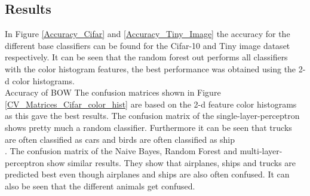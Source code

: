\documentclass[11pt]{article}
\begin{document}
\subsection{Results}
In Figure \ref{Accuracy_Cifar} and \ref{Accuracy_Tiny_Image} the accuracy for the different base classifiers can be found for the Cifar-10 and Tiny image dataset respectively. 
It can be seen that the random forest out performs all classifiers with the color histogram features, the best performance was obtained using the 2-d color histograms.\\
%
Accuracy of BOW
%
The confusion matrices shown in Figure \ref{CV_Matrices_Cifar_color_hist} are based on the 2-d feature color histograms as this gave the best results. The confusion matrix of the single-layer-perceptron shows pretty much a random classifier. Furthermore it can be seen that trucks are often classified as cars and birds are often classified as ship\\. 
The confusion matrix of the Naive Bayes, Random Forest and multi-layer-perceptron show similar results. They show that airplanes, ships and trucks are predicted best even though airplanes and ships are also often confused. It can also be seen that the different animals get confused.
\end{document}
